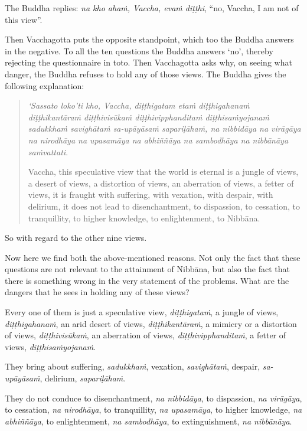 The Buddha replies: \emph{na kho ahaṁ, Vaccha, evaṁ diṭṭhi}, ``no, Vaccha, I am not of this view''.

Then Vacchagotta puts the opposite standpoint, which too the Buddha answers in the negative. To all the ten questions the Buddha answers `no', thereby rejecting the questionnaire in toto. Then Vacchagotta asks why, on seeing what danger, the Buddha refuses to hold any of those views. The Buddha gives the following explanation:

\begin{quote}
\emph{`Sassato loko'ti kho, Vaccha, diṭṭhigatam etaṁ diṭṭhigahanaṁ diṭṭhikantāraṁ diṭṭhivisūkaṁ diṭṭhivipphanditaṁ diṭṭhisaṁyojanaṁ sadukkhaṁ savighātaṁ sa-upāyāsaṁ sapariḷāhaṁ, na nibbidāya na virāgāya na nirodhāya na upasamāya na abhiññāya na sambodhāya na nibbānāya saṁvattati}.

Vaccha, this speculative view that the world is eternal is a jungle of views, a desert of views, a distortion of views, an aberration of views, a fetter of views, it is fraught with suffering, with vexation, with despair, with delirium, it does not lead to disenchantment, to dispassion, to cessation, to tranquillity, to higher knowledge, to enlightenment, to Nibbāna.
\end{quote}

So with regard to the other nine views.

Now here we find both the above-mentioned reasons. Not only the fact that these questions are not relevant to the attainment of Nibbāna, but also the fact that there is something wrong in the very statement of the problems. What are the dangers that he sees in holding any of these views?

Every one of them is just a speculative view, \emph{diṭṭhigataṁ}, a jungle of views, \emph{diṭṭhigahanaṁ}, an arid desert of views, \emph{diṭṭhikantāraṁ}, a mimicry or a distortion of views, \emph{diṭṭhivisūkaṁ}, an aberration of views, \emph{diṭṭhivipphanditaṁ}, a fetter of views, \emph{diṭṭhisaṁyojanaṁ}.

They bring about suffering, \emph{sadukkhaṁ}, vexation, \emph{savighātaṁ}, despair, \emph{sa-upāyāsaṁ}, delirium, \emph{sapariḷāhaṁ}.

They do not conduce to disenchantment, \emph{na nibbidāya}, to dispassion, \emph{na virāgāya}, to cessation, \emph{na nirodhāya}, to tranquillity, \emph{na upasamāya}, to higher knowledge, \emph{na abhiññāya}, to enlightenment, \emph{na sambodhāya}, to extinguishment, \emph{na nibbānāya}.

